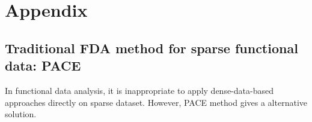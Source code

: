 \documentclass{article}
\begin{document}


\section{Appendix}
\subsection{Traditional FDA method for sparse functional data: PACE \cite{yao2005functional}} 
\label{PACE}
In functional data analysis, it is inappropriate to apply dense-data-based approaches directly on sparse dataset.
However, PACE method gives a alternative solution.
\end{document}
